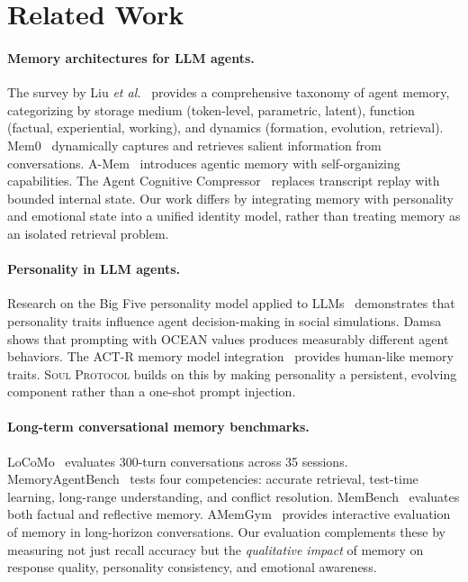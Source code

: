 \documentclass{article}
\newcommand{\soul}{\textsc{Soul Protocol}}
\newcommand{\etal}{\textit{et al.}}
\begin{document}
\section{Related Work}
\label{sec:related}

\paragraph{Memory architectures for LLM agents.}
The survey by Liu \etal{}~\cite{liu2025memory} provides a comprehensive taxonomy of agent memory, categorizing by storage medium (token-level, parametric, latent), function (factual, experiential, working), and dynamics (formation, evolution, retrieval). Mem0~\cite{chhablani2025mem0} dynamically captures and retrieves salient information from conversations. A-Mem~\cite{xu2025amem} introduces agentic memory with self-organizing capabilities. The Agent Cognitive Compressor~\cite{bousetouane2026agentcognitive} replaces transcript replay with bounded internal state. Our work differs by integrating memory with personality and emotional state into a unified identity model, rather than treating memory as an isolated retrieval problem.

\paragraph{Personality in LLM agents.}
Research on the Big Five personality model applied to LLMs~\cite{ren2025bigfive} demonstrates that personality traits influence agent decision-making in social simulations. Damsa~\cite{damsa2024personality} shows that prompting with OCEAN values produces measurably different agent behaviors. The ACT-R memory model integration~\cite{honda2025actr} provides human-like memory traits. \soul{} builds on this by making personality a persistent, evolving component rather than a one-shot prompt injection.

\paragraph{Long-term conversational memory benchmarks.}
LoCoMo~\cite{maharana2024locomo} evaluates 300-turn conversations across 35 sessions. MemoryAgentBench~\cite{hu2026memoryagentbench} tests four competencies: accurate retrieval, test-time learning, long-range understanding, and conflict resolution. MemBench~\cite{tan2025membench} evaluates both factual and reflective memory. AMemGym~\cite{cheng2026amemgym} provides interactive evaluation of memory in long-horizon conversations. Our evaluation complements these by measuring not just recall accuracy but the \textit{qualitative impact} of memory on response quality, personality consistency, and emotional awareness.
\end{document}
